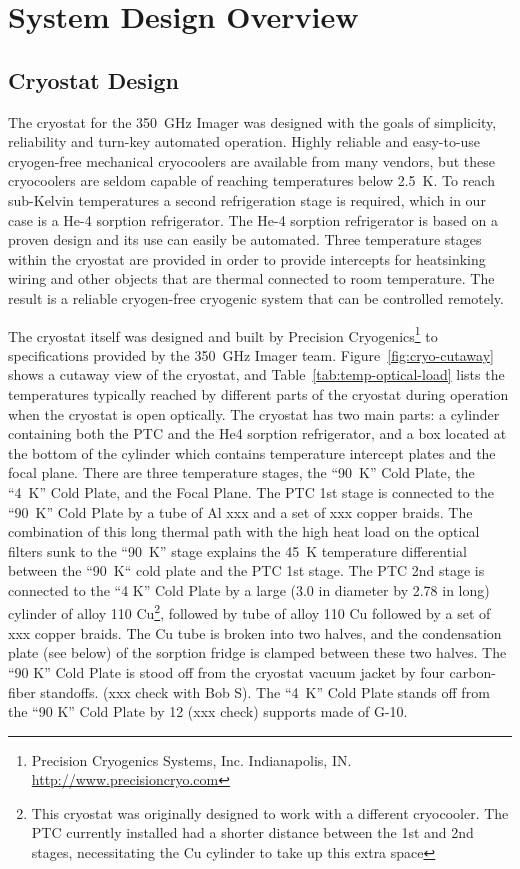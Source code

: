 \documentclass[10pt,twocolumn,article]{memoir}
\newcommand{\figref}[1]{Figure~\ref{#1}}
\newcommand{\tableref}[1]{Table~\ref{#1}}
\begin{document}
\chapter{System Design Overview}\label{c:sys-design}

\section{Cryostat Design}\label{s-cryo-design}

The cryostat for the 350~GHz Imager was designed with the goals of simplicity, reliability and turn-key automated operation.
Highly reliable and easy-to-use cryogen-free mechanical cryocoolers are available from many vendors, but these cryocoolers are seldom capable of reaching temperatures below 2.5~K.
To reach sub-Kelvin temperatures a second refrigeration stage is required, which in our case is a He-4 sorption refrigerator.
The He-4 sorption refrigerator is based on a proven design and its use can easily be automated.
Three temperature stages within the cryostat are provided in order to provide intercepts for heatsinking wiring and other objects that are thermal connected to room temperature. 
The result is a reliable cryogen-free cryogenic system that can be controlled remotely.

The cryostat itself was designed and built by Precision Cryogenics\footnote{Precision Cryogenics Systems, Inc. Indianapolis, IN. \url{http://www.precisioncryo.com}} to specifications provided by the 350~GHz Imager team.
\figref{fig:cryo-cutaway} shows a cutaway view of the cryostat, and \tableref{tab:temp-optical-load} lists the temperatures typically reached by different parts of the cryostat during operation when the cryostat is open optically.
The cryostat has two main parts: a cylinder containing both the PTC and the \-He4 sorption refrigerator, and a box located at the bottom of the cylinder which contains temperature intercept plates and the focal plane.
There are three temperature stages, the ``90~K'' Cold Plate, the ``4~K'' Cold Plate, and the Focal Plane.
The PTC 1st stage is connected to the ``90~K'' Cold Plate by a tube of Al xxx and a set of xxx copper braids.
The combination of this long thermal path with the high heat load on the optical filters sunk to the ``90~K'' stage explains the 45~K temperature differential between the ``90~K`` cold plate and the PTC 1st stage.
The PTC 2nd stage is connected to the ``4 K'' Cold Plate by a large (3.0 in diameter by 2.78 in long) cylinder of alloy 110 Cu\footnote{This cryostat was originally designed to work with a different cryocooler. The PTC currently installed had a shorter distance between the 1st and 2nd stages, necessitating the Cu cylinder to take up this extra space}, followed by tube of alloy 110 Cu followed by a set of xxx copper braids.
The Cu tube is broken into two halves, and the condensation plate (see below) of the sorption fridge is clamped between these two halves. The ``90 K'' Cold Plate is stood off from the cryostat vacuum jacket by four carbon-fiber standoffs. (xxx check with Bob S). The ``4~K'' Cold Plate stands off from the ``90 K'' Cold Plate by 12 (xxx check) supports made of G-10.
\end{document}
